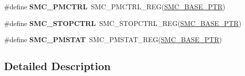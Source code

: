 \begin{DoxyCompactItemize}
\#define {\bfseries S\+M\+C\+\_\+\+P\+M\+C\+T\+RL}~S\+M\+C\+\_\+\+P\+M\+C\+T\+R\+L\+\_\+\+R\+EG(\hyperlink{group___s_m_c___peripheral_ga31b6c4571795341e6446800243313e56}{S\+M\+C\+\_\+\+B\+A\+S\+E\+\_\+\+P\+TR})
\item 
\mbox{\label{group___s_m_c___register___accessor___macros_ga30413a73d6f7e296acd7d1857ebf213e}} 
\#define {\bfseries S\+M\+C\+\_\+\+S\+T\+O\+P\+C\+T\+RL}~S\+M\+C\+\_\+\+S\+T\+O\+P\+C\+T\+R\+L\+\_\+\+R\+EG(\hyperlink{group___s_m_c___peripheral_ga31b6c4571795341e6446800243313e56}{S\+M\+C\+\_\+\+B\+A\+S\+E\+\_\+\+P\+TR})
\item 
\mbox{\label{group___s_m_c___register___accessor___macros_ga6311e0572e3a1f7d84e1069716b64307}} 
\#define {\bfseries S\+M\+C\+\_\+\+P\+M\+S\+T\+AT}~S\+M\+C\+\_\+\+P\+M\+S\+T\+A\+T\+\_\+\+R\+EG(\hyperlink{group___s_m_c___peripheral_ga31b6c4571795341e6446800243313e56}{S\+M\+C\+\_\+\+B\+A\+S\+E\+\_\+\+P\+TR})
\end{DoxyCompactItemize}


\subsection{Detailed Description}

